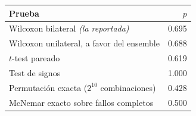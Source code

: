 \begin{tabular}{lr}
\toprule
Prueba & $p$ \\
\midrule
Wilcoxon bilateral \emph{(la reportada)} & 0.695 \\
Wilcoxon unilateral, a favor del ensemble & 0.688 \\
$t$-test pareado & 0.619 \\
Test de signos & 1.000 \\
Permutación exacta ($2^{10}$ combinaciones) & 0.428 \\
McNemar exacto sobre fallos completos & 0.500 \\
\bottomrule
\end{tabular}%